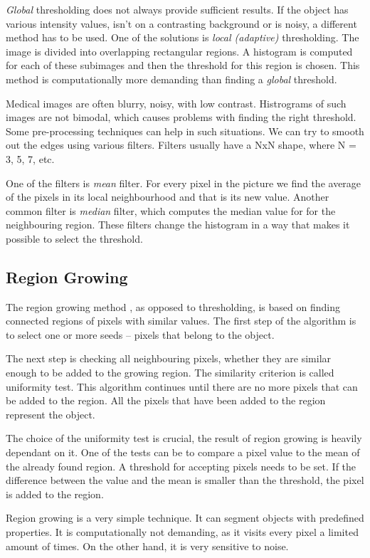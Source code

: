 \textit{Global} thresholding does not always provide sufficient results. If the object has various intensity values, isn't on a contrasting background or is noisy, a different method has to be used. One of the solutions is \textit{local (adaptive)} thresholding. The image is divided into overlapping rectangular regions. A histogram is computed for each of these subimages and then the threshold for this region is chosen. This method is computationally more demanding than finding a \textit{global} threshold. 

Medical images are often blurry, noisy, with low contrast. Histrograms of such images are not bimodal, which causes problems with finding the right threshold. Some pre-processing techniques can help in such situations. We can try to smooth out the edges using various filters. Filters usually have a NxN shape, where N = 3, 5, 7, etc. 

One of the filters is \textit{mean} filter. For every pixel in the picture we find the average of the pixels in its local neighbourhood and that is its new value. Another common filter is \textit{median} filter, which computes the median value for for the neighbouring region. These filters change the histogram in a way that makes it possible to select the threshold. 

\subsection{Region Growing}
The region growing method \cite{medical-imaging-handbook}, as opposed to thresholding, is based on finding connected regions of pixels with similar values. The first step of the algorithm is to select one or more seeds -- pixels that belong to the object. 

The next step is checking all neighbouring pixels, whether they are similar enough to be added to the growing region. The similarity criterion is called uniformity test. This algorithm continues until there are no more pixels that can be added to the region. All the pixels that have been added to the region represent the object. 

The choice of the uniformity test is crucial, the result of region growing is heavily dependant on it. One of the tests can be to compare a pixel value to the mean of the already found region. A threshold for accepting pixels needs to be set. If the difference between the value and the mean is smaller than the threshold, the pixel is added to the region.

Region growing is a very simple technique. It can segment objects with predefined properties. It is computationally not demanding, as it visits every pixel a limited amount of times. On the other hand, it is very sensitive to noise.


